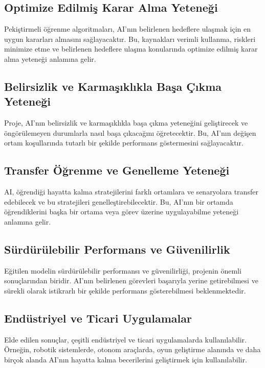 \documentclass{article}
\begin{document}
\subsection{Optimize Edilmiş Karar Alma Yeteneği}
Pekiştirmeli öğrenme algoritmaları, AI'nın belirlenen hedeflere ulaşmak için en uygun kararları almasını sağlayacaktır. Bu, kaynakları verimli kullanma, riskleri minimize etme ve belirlenen hedeflere ulaşma konularında optimize edilmiş karar alma yeteneği anlamına gelir.
\subsection{Belirsizlik ve Karmaşıklıkla Başa Çıkma Yeteneği}
Proje, AI'nın belirsizlik ve karmaşıklıkla başa çıkma yeteneğini geliştirecek ve öngörülemeyen durumlarla nasıl başa çıkacağını öğretecektir. Bu, AI'nın değişen ortam koşullarında tutarlı bir şekilde performans göstermesini sağlayacaktır.

\subsection{Transfer Öğrenme ve Genelleme Yeteneği}
AI, öğrendiği hayatta kalma stratejilerini farklı ortamlara ve senaryolara transfer edebilecek ve bu stratejileri genelleştirebilecektir. Bu, AI'nın bir ortamda öğrendiklerini başka bir ortama veya görev üzerine uygulayabilme yeteneği anlamına gelir.
\subsection{Sürdürülebilir Performans ve Güvenilirlik}
Eğitilen modelin sürdürülebilir performansı ve güvenilirliği, projenin önemli sonuçlarından biridir. AI'nın belirlenen görevleri başarıyla yerine getirebilmesi ve sürekli olarak istikrarlı bir şekilde performans gösterebilmesi beklenmektedir.
\subsection{Endüstriyel ve Ticari Uygulamalar}
Elde edilen sonuçlar, çeşitli endüstriyel ve ticari uygulamalarda kullanılabilir. Örneğin, robotik sistemlerde, otonom araçlarda, oyun geliştirme alanında ve daha birçok alanda AI'nın hayatta kalma becerilerini geliştirmek için kullanılabilir.
\newpage


\end{document}
